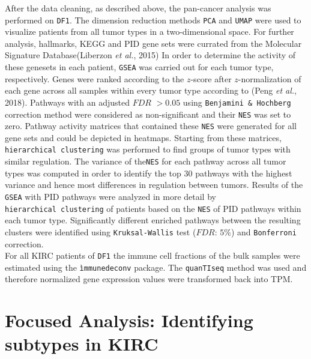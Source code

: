 \documentclass[
  parskip,
  openany]{scrreprt}
\begin{document}
After the data cleaning, as described above, the pan-cancer analysis was
performed on \texttt{DF1}. The dimension reduction methods \texttt{PCA}
and \texttt{UMAP} were used to visualize patients from all tumor types
in a two-dimensional space. For further analysis, hallmarks, KEGG and
PID gene sets were currated from the Molecular Signature
Database(Liberzon \emph{et al.}, 2015) In order to determine the
activity of these genesets in each patient, \texttt{GSEA} was carried
out for each tumor type, respectively. Genes were ranked according to
the \(z\)-score after \(z\)-normalization of each gene across all
samples within every tumor type according to (Peng \emph{et al.}, 2018).
Pathways with an adjusted \(FDR\) \(>0.05\) using
\texttt{Benjamini\ \&\ Hochberg} correction method were considered as
non-significant and their \texttt{NES} was set to zero. Pathway activity
matrices that contained these \texttt{NES} were generated for all gene
sets and could be depicted in heatmaps. Starting from these matrices,
\texttt{hierarchical\ clustering} was performed to find groups of tumor
types with similar regulation. The variance of the\texttt{NES} for each
pathway across all tumor types was computed in order to identify the top
30 pathways with the highest variance and hence most differences in
regulation between tumors. Results of the \texttt{GSEA} with PID
pathways were analyzed in more detail by
\texttt{hierarchical\ clustering} of patients based on the \texttt{NES}
of PID pathways within each tumor type. Significantly different enriched
pathways between the resulting clusters were identified using
\texttt{Kruksal-Wallis} test (\(FDR\): \(5\%\)) and \texttt{Bonferroni}
correction.\\
For all KIRC patients of \texttt{DF1} the immune cell fractions of the
bulk samples were estimated using the \texttt{ìmmunedeconv} package. The
\texttt{quanTIseq} method was used and therefore normalized gene
expression values were transformed back into TPM.

\hypertarget{focused-analysis-identifying-subtypes-in-kirc}{%
\section{Focused Analysis: Identifying subtypes in
KIRC}\label{focused-analysis-identifying-subtypes-in-kirc}}
\end{document}
